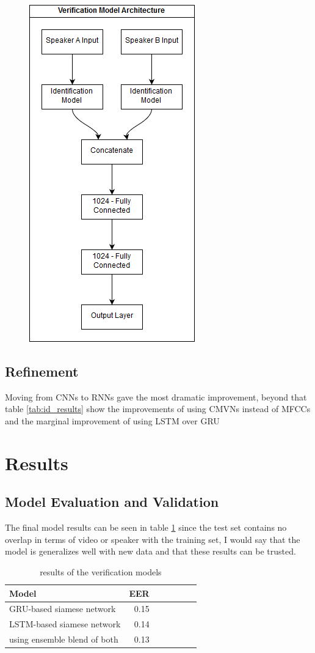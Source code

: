 \documentclass{article}
\begin{document}
\begin{figure}
    \centering
    \includegraphics[scale=.65]{images/verification_model.png}
    \label{fig:ver_arch}
\end{figure}

\subsection{Refinement}
Moving from CNNs to RNNs gave the most dramatic improvement, beyond that table \ref{tab:id_results} show the improvements of using CMVNs instead of MFCCs and the marginal improvement of using LSTM over GRU
\section{Results}
\subsection{Model Evaluation and Validation}
The final model results can be seen in table \ref{tab:ver_results} since the test set contains no overlap in terms of video or speaker with the training set, I would say that the model is generalizes well with new data and that these results can be trusted.
\begin{table}[]
    \centering
    \begin{tabular}{l*{6}r}
        Model & EER\\
        \hline
        GRU-based siamese network & 0.15  \\
        LSTM-based siamese network & 0.14  \\
        using ensemble blend of both & 0.13  \\
    \end{tabular}
    \caption{results of the verification models}
    \label{tab:ver_results}
\end{table}
\end{document}
